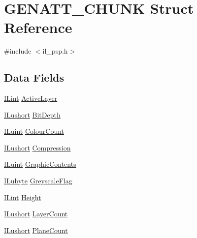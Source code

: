 \hypertarget{struct_g_e_n_a_t_t___c_h_u_n_k}{\section{G\-E\-N\-A\-T\-T\-\_\-\-C\-H\-U\-N\-K Struct Reference}
\label{struct_g_e_n_a_t_t___c_h_u_n_k}
}


{\ttfamily \#include $<$il\-\_\-psp.\-h$>$}

\subsection*{Data Fields}
\begin{DoxyCompactItemize}
\item 
\hyperlink{il_8h_a288a97fb9e92e707a60b749d0039fafe}{I\-Lint} \hyperlink{struct_g_e_n_a_t_t___c_h_u_n_k_a56c9181c87ce5b72dcde3ce09ddb962a}{Active\-Layer}
\item 
\hyperlink{il_8h_af6287b43748354a7c4864da43ae56962}{I\-Lushort} \hyperlink{struct_g_e_n_a_t_t___c_h_u_n_k_a7f23c52b21e16bf54ad81542779d038e}{Bit\-Depth}
\item 
\hyperlink{il_8h_ac6508d0e9c19e32f32e00d54b5b8cf30}{I\-Luint} \hyperlink{struct_g_e_n_a_t_t___c_h_u_n_k_afe1a162433467bc2b8d41390c5e12f46}{Colour\-Count}
\item 
\hyperlink{il_8h_af6287b43748354a7c4864da43ae56962}{I\-Lushort} \hyperlink{struct_g_e_n_a_t_t___c_h_u_n_k_a3b3b2f88b942baa6ef5bf2e2429b8c99}{Compression}
\item 
\hyperlink{il_8h_ac6508d0e9c19e32f32e00d54b5b8cf30}{I\-Luint} \hyperlink{struct_g_e_n_a_t_t___c_h_u_n_k_a13ffb1b20e97a5719dd35ccb191a37a9}{Graphic\-Contents}
\item 
\hyperlink{il_8h_a8d2f04500100a86d1b00e98ab1b15a33}{I\-Lubyte} \hyperlink{struct_g_e_n_a_t_t___c_h_u_n_k_ab135ef267c7d8b8d88471f4a71e8b443}{Greyscale\-Flag}
\item 
\hyperlink{il_8h_a288a97fb9e92e707a60b749d0039fafe}{I\-Lint} \hyperlink{struct_g_e_n_a_t_t___c_h_u_n_k_a6ab8e5a8c7842b5a57104e36b9a49f33}{Height}
\item 
\hyperlink{il_8h_af6287b43748354a7c4864da43ae56962}{I\-Lushort} \hyperlink{struct_g_e_n_a_t_t___c_h_u_n_k_ad343451e83995745e434086b4d8bf2e3}{Layer\-Count}
\item 
\hyperlink{il_8h_af6287b43748354a7c4864da43ae56962}{I\-Lushort} \hyperlink{struct_g_e_n_a_t_t___c_h_u_n_k_a62638b3d34a4b15120e97bd74c2afa50}{Plane\-Count}
\item 

\end{DoxyCompactItemize}
